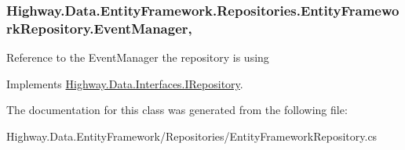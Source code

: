 \hypertarget{class_highway_1_1_data_1_1_entity_framework_1_1_repositories_1_1_entity_framework_repository_abb629b7ba44c32a78951f64554f52e06}{
\subsubsection[{Event\-Manager}]{ Highway.\-Data.\-Entity\-Framework.\-Repositories.\-Entity\-Framework\-Repository.\-Event\-Manager\hspace{0.3cm}{\ttfamily [get]}, {\ttfamily [set]}}}\label{class_highway_1_1_data_1_1_entity_framework_1_1_repositories_1_1_entity_framework_repository_abb629b7ba44c32a78951f64554f52e06}


Reference to the Event\-Manager the repository is using 



Implements \hyperlink{interface_highway_1_1_data_1_1_interfaces_1_1_i_repository_a2f76cda20f7e51ce44c11a077194c747}{Highway.\-Data.\-Interfaces.\-I\-Repository}.



The documentation for this class was generated from the following file\-:\begin{DoxyCompactItemize}
\item 
Highway.\-Data.\-Entity\-Framework/\-Repositories/Entity\-Framework\-Repository.\-cs\end{DoxyCompactItemize}
